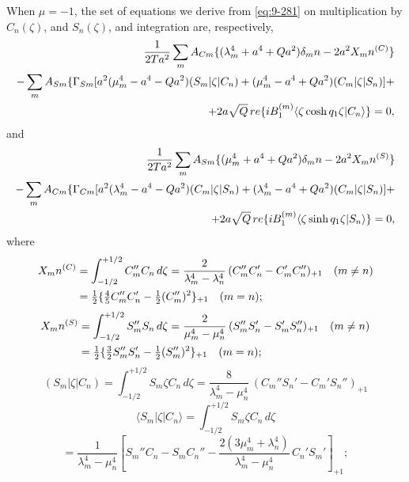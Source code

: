 When $\mu = -1$, the set of equations we derive from \eqref{eq:9-281} on multiplication by $C_n(\zeta)$, and $S_n(\zeta)$, and integration are, respectively,
\begin{align}
\frac{1}{2\mathscr{T} a^2}\sum_m A_{Cm}\{(\lambda_m^4 + a^4 + Qa^2)\delta_\mathrm{mn} - 2a^2 X_\mathrm{mn}^{(C)}\} \notag \\
- \sum_m A_{Sm}\{\Gamma_{Sm}[a^2(\mu_m^4 - a^4 - Qa^2)(S_m|\zeta|C_n) + (\mu_m^4 - a^4 + Qa^2)(C_m|\zeta|S_n)] + \notag \\
\quad + 2a\sqrt{Q}\,\mathrm{re}\{iB_1^{(m)}\langle\zeta\cosh q_1\zeta|C_n\rangle\} = 0, \label{eq:9-282}
\end{align}
and
\begin{align}
\frac{1}{2\mathscr{T} a^2}\sum_m A_{Sm}\{(\mu_m^4 + a^4 + Qa^2)\delta_\mathrm{mn} - 2a^2 X_\mathrm{mn}^{(S)}\} \notag \\
- \sum_m A_{Cm}\{\Gamma_{Cm}[a^2(\lambda_m^4 - a^4 - Qa^2)(C_m|\zeta|S_n) + (\lambda_m^4 - a^4 + Qa^2)(C_m|\zeta|S_n)] + \notag \\
\quad + 2a\sqrt{Q}\,\mathrm{re}\{iB_1^{(m)}\langle\zeta\sinh q_1\zeta|S_n\rangle\} = 0, \label{eq:9-283}
\end{align}
where
\begin{align}
X_\mathrm{mn}^{(C)} &= \int_{-1/2}^{+1/2} C_m'' C_n\, d\zeta = \frac{2}{\lambda_m^4 - \lambda_n^4}\,(C_m'' C_n' - C_m' C_n'')_{+1} \quad (m \ne n) \label{eq:9-284} \\
&= \tfrac{1}{2}\{\tfrac{4}{5}C_m'' C_n' - \tfrac{1}{2}(C_m'')^2\}_{+1} \quad (m = n); \notag
\end{align}
\begin{align}
X_\mathrm{mn}^{(S)} &= \int_{-1/2}^{+1/2} S_m'' S_n\, d\zeta = \frac{2}{\mu_m^4 - \mu_n^4}\,(S_m'' S_n' - S_m' S_n'')_{+1} \quad (m \ne n) \label{eq:9-285} \\
&= \tfrac{1}{2}\{\tfrac{3}{2}S_m'' S_n' - \tfrac{1}{2}(S_m'')^2\}_{+1} \quad (m = n); \notag
\end{align}
\begin{equation}
(S_m|\zeta|C_n) = \int_{-1/2}^{+1/2} S_m\zeta C_n\, d\zeta = \frac{8}{\lambda_m^4 - \mu_n^4}\,(C_m'' S_n' - C_m' S_n'')_{+1} \label{eq:9-286}
\end{equation}
\begin{equation}
\langle S_m|\zeta|C_n\rangle = \int_{-1/2}^{+1/2} S_m\zeta C_n\, d\zeta \label{eq:9-287}
\end{equation}
\[
= \frac{1}{\lambda_m^4 - \mu_n^4}\left[S_m'' C_n - S_m C_n'' - \frac{2(3\mu_m^4 + \lambda_n^4)}{\lambda_m^4 - \mu_n^4}\, C_n' S_m'\right]_{+1};
\]
